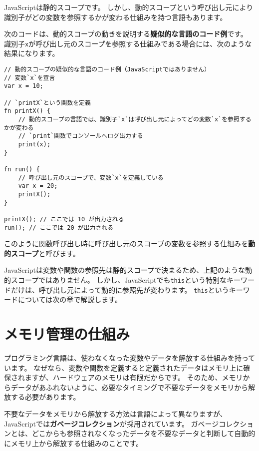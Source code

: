 \begin{tcolorbox}[title=動的スコープ]\label{dynamic-scope}

JavaScriptは静的スコープです。
しかし、動的スコープという呼び出し元により識別子がどの変数を参照するかが変わる仕組みを持つ言語もあります。

次のコードは、動的スコープの動きを説明する\textbf{疑似的な言語のコード例}です。
識別子\texttt{x}が呼び出し元のスコープを参照する仕組みである場合には、次のような結果になります。

\begin{lstlisting}
// 動的スコープの疑似的な言語のコード例（JavaScriptではありません）
// 変数`x`を宣言
var x = 10;

// `printX`という関数を定義
fn printX() {
    // 動的スコープの言語では、識別子`x`は呼び出し元によってどの変数`x`を参照するかが変わる
    // `print`関数でコンソールへログ出力する
    print(x);
}

fn run() {
    // 呼び出し元のスコープで、変数`x`を定義している
    var x = 20;
    printX();
}

printX(); // ここでは 10 が出力される
run(); // ここでは 20 が出力される
\end{lstlisting}

このように関数呼び出し時に呼び出し元のスコープの変数を参照する仕組みを\textbf{動的スコープ}と呼びます。

JavaScriptは変数や関数の参照先は静的スコープで決まるため、上記のような動的スコープではありません。
しかし、JavaScriptでも\texttt{this}という特別なキーワードだけは、呼び出し元によって動的に参照先が変わります。
\texttt{this}というキーワードについては次の章で解説します。
\end{tcolorbox}

\hypertarget{memory-management}{%
\section{メモリ管理の仕組み}\label{memory-management}}

プログラミング言語は、使わなくなった変数やデータを解放する仕組みを持っています。
なぜなら、変数や関数を定義すると定義されたデータはメモリ上に確保されますが、ハードウェアのメモリは有限だからです。
そのため、メモリからデータがあふれないように、必要なタイミングで不要なデータをメモリから解放する必要があります。

不要なデータをメモリから解放する方法は言語によって異なりますが、JavaScriptでは\textbf{ガベージコレクション}が採用されています。
ガベージコレクションとは、どこからも参照されなくなったデータを不要なデータと判断して自動的にメモリ上から解放する仕組みのことです。

